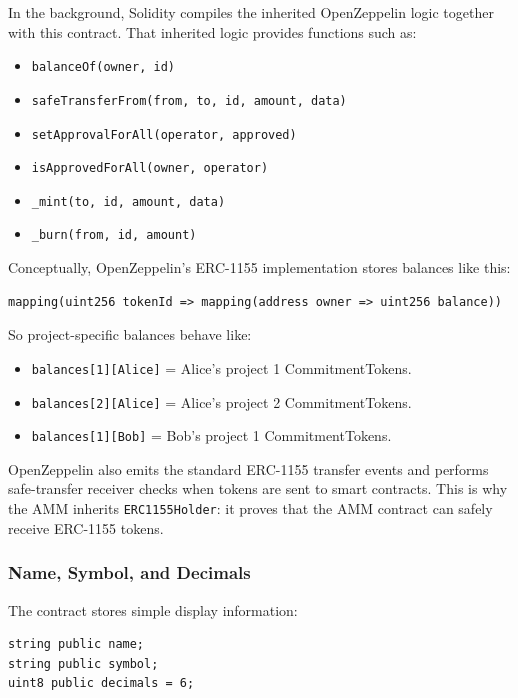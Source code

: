 \documentclass[11pt,a4paper]{article}
\begin{document}
In the background, Solidity compiles the inherited OpenZeppelin logic together with this contract. That inherited logic provides functions such as:

\begin{itemize}
  \item \texttt{balanceOf(owner, id)}
  \item \texttt{safeTransferFrom(from, to, id, amount, data)}
  \item \texttt{setApprovalForAll(operator, approved)}
  \item \texttt{isApprovedForAll(owner, operator)}
  \item \texttt{\_mint(to, id, amount, data)}
  \item \texttt{\_burn(from, id, amount)}
\end{itemize}

Conceptually, OpenZeppelin's ERC-1155 implementation stores balances like this:

\begin{lstlisting}
mapping(uint256 tokenId => mapping(address owner => uint256 balance))
\end{lstlisting}

So project-specific balances behave like:

\begin{itemize}
  \item \texttt{balances[1][Alice]} = Alice's project 1 CommitmentTokens.
  \item \texttt{balances[2][Alice]} = Alice's project 2 CommitmentTokens.
  \item \texttt{balances[1][Bob]} = Bob's project 1 CommitmentTokens.
\end{itemize}

OpenZeppelin also emits the standard ERC-1155 transfer events and performs safe-transfer receiver checks when tokens are sent to smart contracts. This is why the AMM inherits \texttt{ERC1155Holder}: it proves that the AMM contract can safely receive ERC-1155 tokens.

\subsubsection{Name, Symbol, and Decimals}

The contract stores simple display information:

\begin{lstlisting}
string public name;
string public symbol;
uint8 public decimals = 6;
\end{lstlisting}
\end{document}
